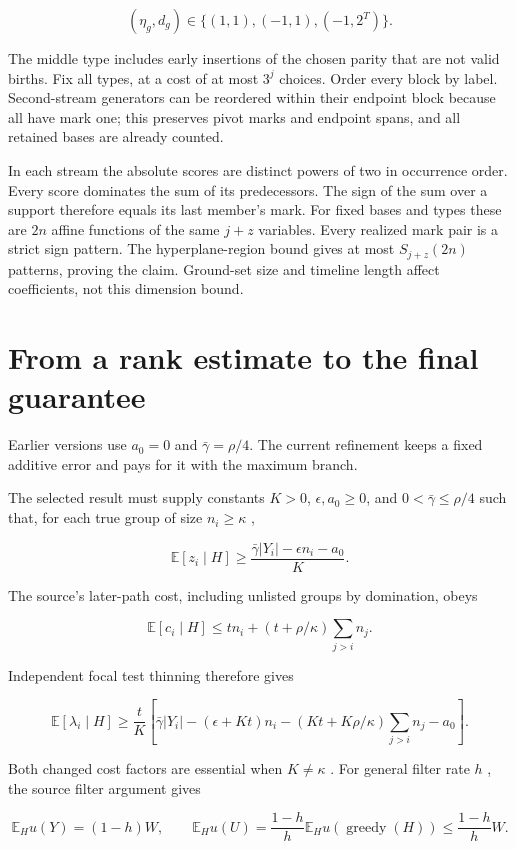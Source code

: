 \documentclass[11pt]{article}
\begin{document}
\[(\eta_g,d_g)\in\{(1,1),(-1,1),(-1,2^T)\}.\]

The middle type includes early insertions of the chosen parity that are not valid births. Fix all types, at a cost of at most \(3^j\) choices. Order every block by label. Second-stream generators can be reordered within their endpoint block because all have mark one; this preserves pivot marks and endpoint spans, and all retained bases are already counted.

In each stream the absolute scores are distinct powers of two in occurrence order. Every score dominates the sum of its predecessors. The sign of the sum over a support therefore equals its last member's mark. For fixed bases and types these are \(2n\) affine functions of the same \(j+z\) variables. Every realized mark pair is a strict sign pattern. The hyperplane-region bound gives at most \(S_{j+z}(2n)\) patterns, proving the claim. Ground-set size and timeline length affect coefficients, not this dimension bound.

\section{From a rank estimate to the final guarantee}\label{from-a-rank-estimate-to-the-final-guarantee}

Earlier versions use \(a_0=0\) and \(\bar\gamma=\rho/4\). The current refinement keeps a fixed additive error and pays for it with the maximum branch.

The selected result must supply constants \(K>0\), \(\epsilon,a_0\ge0\), and \(0<\bar\gamma\le\rho/4\) such that, for each true group of size \(n_i\ge\kappa\) ,

\[\mathbb E[z_i\mid H]\ge\frac{\bar\gamma|Y_i|-\epsilon n_i-a_0}{K}.\]

The source's later-path cost, including unlisted groups by domination, obeys

\[\mathbb E[c_i\mid H]\le t n_i+(t+\rho/\kappa)\sum_{j>i}n_j.\]

Independent focal test thinning therefore gives

\[\mathbb E[\lambda_i\mid H]\ge\frac tK\left[
\bar\gamma|Y_i|-(\epsilon+Kt)n_i-
(Kt+K\rho/\kappa)\sum_{j>i}n_j-a_0\right].\]

Both changed cost factors are essential when \(K\ne\kappa\) . For general filter rate \(h\) , the source filter argument gives

\[\mathbb E_H u(Y)=(1-h)W,\qquad
\mathbb E_H u(U)=\frac{1-h}{h}\mathbb E_Hu(\operatorname{greedy}(H))
\le\frac{1-h}{h}W.\]
\end{document}
